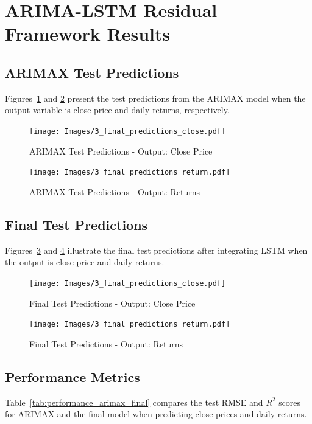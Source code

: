 \newpage
\section{ARIMA-LSTM Residual Framework Results}

\subsection{ARIMAX Test Predictions}
Figures~\ref{fig:arimax_close} and \ref{fig:arimax_returns} present the test predictions from the ARIMAX model when the output variable is close price and daily returns, respectively.

\begin{figure}[h!]
    \centering
    \texttt{[image: Images/3\_final\_predictions\_close.pdf]}
    \caption{ARIMAX Test Predictions - Output: Close Price}
    \label{fig:arimax_close}
\end{figure}

\begin{figure}[h!]
    \centering
    \texttt{[image: Images/3\_final\_predictions\_return.pdf]}
    \caption{ARIMAX Test Predictions - Output: Returns}
    \label{fig:arimax_returns}
\end{figure}

\subsection{Final Test Predictions}
Figures~\ref{fig:final_close} and \ref{fig:final_returns} illustrate the final test predictions after integrating LSTM when the output is close price and daily returns.

\begin{figure}[h!]
    \centering
    \texttt{[image: Images/3\_final\_predictions\_close.pdf]}
    \caption{Final Test Predictions - Output: Close Price}
    \label{fig:final_close}
\end{figure}

\begin{figure}[h!]
    \centering
    \texttt{[image: Images/3\_final\_predictions\_return.pdf]}
    \caption{Final Test Predictions - Output: Returns}
    \label{fig:final_returns}
\end{figure}

\subsection{Performance Metrics}
Table~\ref{tab:performance_arimax_final} compares the test RMSE and \( R^2 \) scores for ARIMAX and the final model when predicting close prices and daily returns.

